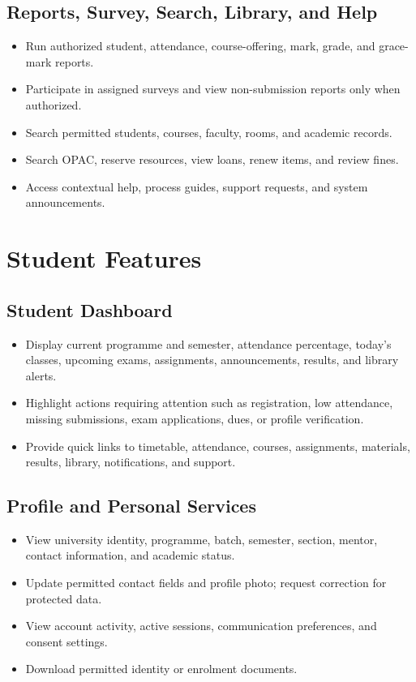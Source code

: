 \documentclass[10pt,a4paper]{article}
\begin{document}
\subsection{Reports, Survey, Search, Library, and Help}
\begin{itemize}
  \item Run authorized student, attendance, course-offering, mark, grade, and grace-mark reports.
  \item Participate in assigned surveys and view non-submission reports only when authorized.
  \item Search permitted students, courses, faculty, rooms, and academic records.
  \item Search OPAC, reserve resources, view loans, renew items, and review fines.
  \item Access contextual help, process guides, support requests, and system announcements.
\end{itemize}

\newpage
\section{Student Features}

\subsection{Student Dashboard}
\begin{itemize}
  \item Display current programme and semester, attendance percentage, today's classes,
        upcoming exams, assignments, announcements, results, and library alerts.
  \item Highlight actions requiring attention such as registration, low attendance,
        missing submissions, exam applications, dues, or profile verification.
  \item Provide quick links to timetable, attendance, courses, assignments,
        materials, results, library, notifications, and support.
\end{itemize}

\subsection{Profile and Personal Services}
\begin{itemize}
  \item View university identity, programme, batch, semester, section, mentor,
        contact information, and academic status.
  \item Update permitted contact fields and profile photo; request correction for protected data.
  \item View account activity, active sessions, communication preferences, and consent settings.
  \item Download permitted identity or enrolment documents.
\end{itemize}
\end{document}
